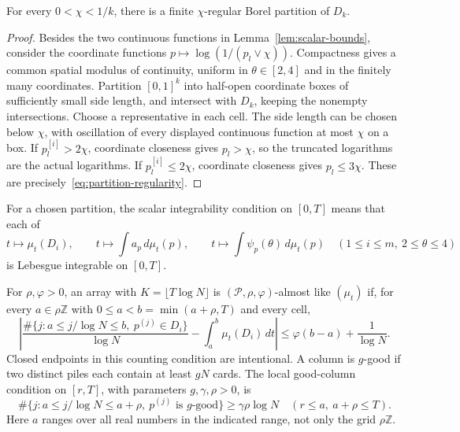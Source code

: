 \begin{lemma}\label{lem:regular-partition}
For every $0<\chi<1/k$, there is a finite $\chi$-regular Borel
partition of $D_k$.
\end{lemma}

\begin{proof}
Besides the two continuous functions in Lemma~\ref{lem:scalar-bounds},
consider the coordinate functions
$p\mapsto\log(1/(p_l\vee\chi))$. Compactness gives a common spatial
modulus of continuity, uniform in $\theta\in[2,4]$ and in the finitely
many coordinates. Partition $[0,1]^k$ into half-open coordinate boxes
of sufficiently small side length, and intersect with $D_k$, keeping
the nonempty intersections. Choose a representative in each cell.
The side length can be chosen below $\chi$, with oscillation of every
displayed continuous function at most $\chi$ on a box. If
$p^{[i]}_l>2\chi$, coordinate closeness gives $p_l>\chi$, so the
truncated logarithms are the actual logarithms. If
$p^{[i]}_l\le2\chi$, coordinate closeness gives $p_l\le3\chi$.
These are precisely~\eqref{eq:partition-regularity}.
\end{proof}

For a chosen partition, the scalar integrability condition on $[0,T]$
means that each of
\begin{equation}\label{eq:scalar-integrability}
 t\longmapsto\mu_t(D_i),\qquad
 t\longmapsto\int a_p\,d\mu_t(p),\qquad
 t\longmapsto\int\psi_p(\theta)\,d\mu_t(p)
 \quad(1\le i\le m,\ 2\le\theta\le4)
\end{equation}
is Lebesgue integrable on $[0,T]$.

For $\rho,\varphi>0$, an array with $K=\lfloor T\log N\rfloor$ is
$(\mathcal P,\rho,\varphi)$-almost like $(\mu_t)$ if, for every
$a\in\rho\mathbb Z$ with $0\le a<b=\min(a+\rho,T)$ and every cell,
\begin{equation}\label{eq:almost-like}
 \left|\frac{\#\{j:a\le j/\log N\le b,\ p^{(j)}\in D_i\}}{\log N}
       -\int_a^b\mu_t(D_i)\,dt\right|
 \le\varphi(b-a)+\frac1{\log N}.
\end{equation}
Closed endpoints in this counting condition are intentional. A column
is $g$-good if two distinct piles each contain at least $gN$ cards.
The local good-column condition on $[r,T]$, with parameters
$g,\gamma,\rho>0$, is
\begin{equation}\label{eq:local-good}
 \#\{j:a\le j/\log N\le a+\rho,\ p^{(j)}\text{ is }g\text{-good}\}
 \ge\gamma\rho\log N
 \quad(r\le a,\ a+\rho\le T).
\end{equation}
Here $a$ ranges over all real numbers in the indicated range, not only
the grid $\rho\mathbb Z$.

